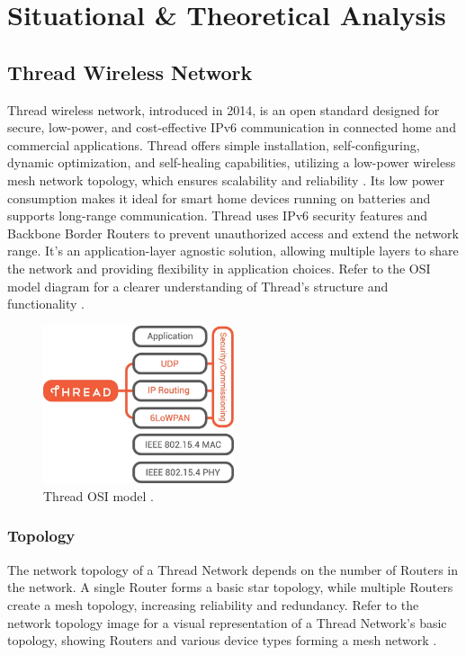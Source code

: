 \chapter{Situational \& Theoretical Analysis}\label{chap:situational_theoretical_analysis}

\section{Thread Wireless Network}\label{sec:thread_wireless_network}
Thread wireless network, introduced in 2014, is an open standard designed for secure, low-power, and cost-effective IPv6 communication in connected home and commercial applications. Thread offers simple installation, self-configuring, dynamic optimization, and self-healing capabilities, utilizing a low-power wireless mesh network topology, which ensures scalability and reliability \cite{Thread_Group_Benefits}. Its low power consumption makes it ideal for smart home devices running on batteries and supports long-range communication. Thread uses IPv6 security features and Backbone Border Routers to prevent unauthorized access and extend the network range. It's an application-layer agnostic solution, allowing multiple layers to share the network and providing flexibility in application choices. Refer to the OSI model diagram for a clearer understanding of Thread's structure and functionality \cite{Thread_Group_Fundamentals}.

\begin{figure}[!htb]
    \centering
    \includegraphics[width=0.5\textwidth]{images/situational_theoretical_analysis/osi_model.png}
    \caption{Thread OSI model \cite{Thread_Group_Fundamentals}.}
    \label{fig:osi_model}
\end{figure}

\subsection{Topology}
The network topology of a Thread Network depends on the number of Routers in the network. A single Router forms a basic star topology, while multiple Routers create a mesh topology, increasing reliability and redundancy. Refer to the network topology image for a visual representation of a Thread Network's basic topology, showing Routers and various device types forming a mesh network \cite{Thread_Group_Fundamentals}.

